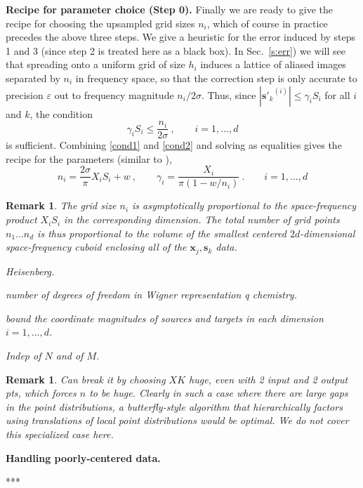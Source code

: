 \documentclass[10pt]{article}
\newcommand{\be}{\begin{equation}}
\newcommand{\ee}{\end{equation}}
\newcommand{\mbf}[1]{{\mathbf #1}}
\newcommand{\eps}{\varepsilon}
\newtheorem{rmk}[thm]{Remark}
\newcommand{\xx}{\mbf{x}}
\newcommand{\sss}{\mbf{s}}
\newcommand{\rat}{\sigma}          %
\begin{document}
{\bf Recipe for parameter choice (Step 0).}
Finally we are ready to give the recipe for choosing the upsampled grid
sizes $n_i$, which of course in practice precedes the above three steps.
We give a heuristic for the
error induced by steps 1 and 3 (since step 2 is treated
here as a black box).
In Sec.~\ref{s:err}) we will see that spreading onto a uniform grid
of size $h_i$ induces a lattice of
aliased images separated by $n_i$ in frequency space,
so that the correction step is only accurate to precision $\eps$ out to
frequency magnitude $n_i/2\rat$.
Thus, since $|{\sss'_k}^{(i)}| \le \gamma_i S_i$ for all $i$ and $k$,
the condition
\be
\gamma_i S_i \le \frac{n_i}{2\rat}
~,\qquad i=1,\dots,d
\label{cond2}
\ee
is sufficient.
Combining \eqref{cond1} and \eqref{cond2} and solving as equalities
gives the recipe for the parameters (similar to \cite[Rmk.~1]{nufft3}),
\be
n_i = \frac{2\rat}{\pi}X_iS_i + w
~,\qquad
\gamma_i = %
\frac{X_i}{\pi(1 - w/n_i)}
~.
\qquad i=1,\dots,d
\label{ng}
\ee
\begin{rmk}
  The grid size $n_i$ is asymptotically proportional to the space-frequency
  product $X_iS_i$ in the corresponding dimension. The total number of grid points $n_1\dots n_d$ is thus proportional to the volume of the smallest centered $2d$-dimensional space-frequency cuboid enclosing all of the $\xx_j, \sss_k$ data.
  
Heisenberg.

number of degrees of freedom in Wigner representation q chemistry.

bound the coordinate magnitudes of sources and targets
in each dimension $i=1,\dots,d$.

Indep of $N$ and of $M$.

\end{rmk}

\begin{rmk}
Can break it by choosing $XK$ huge, even with 2 input and 2 output pts,
which forces $n$ to be huge.
Clearly in such a case where there are large gaps in the
point distributions, a butterfly-style algorithm that
hierarchically factors using translations of local point distributions
would be optimal.
We do not cover this specialized case here.
\end{rmk}





{\bf Handling poorly-centered data.}

***
\end{document}
